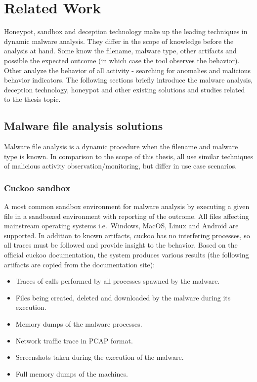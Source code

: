 \chapter{Related Work \label{related}}
Honeypot, sandbox and deception technology make up the leading techniques in dynamic malware analysis. They differ in the scope of knowledge before the analysis at hand. Some know the filename, malware type, other artifacts and possible the expected outcome (in which case the tool observes the behavior). Other analyze the behavior of all activity - searching for anomalies and malicious behavior indicators. The following sections briefly introduce the malware analysis, deception technology, honeypot and other existing solutions and studies related to the thesis topic.

\section{Malware file analysis solutions \label{related:malware-anal}}
Malware file analysis is a dynamic procedure when the filename and malware type is known. In comparison to the scope of this thesis, all use similar techniques of malicious activity observation/monitoring, but differ in use case scenarios.

\subsection{Cuckoo sandbox \label{related:malware-anal:cuckoo}}
A most common sandbox environment for malware analysis by executing a given file in a sandboxed environment with reporting of the outcome. All files affecting mainstream operating systems i.e.~Windows, MacOS, Linux and Android are supported. In addition to known artifacts, cuckoo has no interfering processes, so all traces must be followed and provide insight to the behavior. Based on the official cuckoo documentation, the system produces various results (the following artifacts are copied from the documentation site):

\begin{itemize}[noitemsep]
	\item
	Traces of calls performed by all processes spawned by the malware.
	\item
	Files being created, deleted and downloaded by the malware during its execution.
	\item
	Memory dumps of the malware processes.
	\item
	Network traffic trace in PCAP format.
	\item
	Screenshots taken during the execution of the malware.
	\item
	Full memory dumps of the machines.
\end{itemize}

